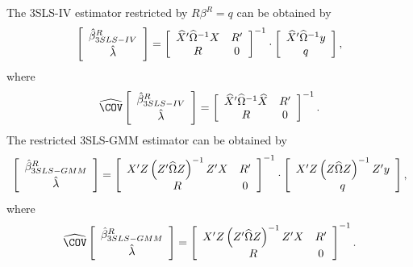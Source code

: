 The 3SLS-IV estimator restricted by $R \beta^R = q$ can be obtained by
\begin{equation}
   \left[ \begin{array}{c}
      \hat{\beta}^R_{3SLS-IV} \\[0.2em] \hat{\lambda}
   \end{array} \right]
   =
   \left[ \begin{array}{cc}
      \widehat{X}' \widehat{\Omega}^{-1} X & R' \\
      R & 0
   \end{array} \right]^{-1}
   \cdot
   \left[ \begin{array}{c}
      \widehat{X}' \widehat{\Omega}^{-1} y \\ q
   \end{array} \right] ,
   \label{eq:3slsIvR}
\end{equation}
where
\begin{equation}
   \COVHat
   \left[ \begin{array}{c}
      \bHat^R_{3SLS-IV} \\[0.2em] \lHat
   \end{array} \right] 
   = 
   \left[ \begin{array}{cc}
      \XHat' \OHat^{-1} \XHat & R' \\
      R & 0
   \end{array} \right]^{-1} .
\end{equation}
The restricted 3SLS-GMM estimator can be obtained by
\begin{equation}
   \left[ \begin{array}{c}
      \hat{\beta}^R_{3SLS-GMM} \\[0.2em] \hat{\lambda}
   \end{array} \right]
   =
   \left[ \begin{array}{cc}
      X' Z \left( Z' \widehat{\Omega} Z \right)^{-1} Z' X & R' \\
      R & 0
   \end{array} \right]^{-1}
   \cdot
   \left[ \begin{array}{c}
      X' Z \left( Z \widehat{\Omega} Z \right)^{-1} Z' y \\ q
   \end{array} \right] ,
   \label{eq:3slsGmmR}
\end{equation}
where
\begin{equation}
   \COVHat
   \left[ \begin{array}{c}
      \bHat^R_{3SLS-GMM} \\[0.2em] \lHat
   \end{array} \right] 
   = 
   \left[ \begin{array}{cc}
      X' Z \left( Z' \OHat Z \right)^{-1} Z' X & R' \\
      R & 0
   \end{array} \right]^{-1} .
\end{equation}
